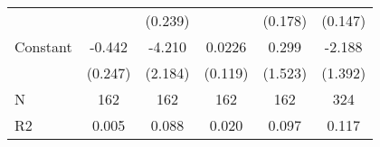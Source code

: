 {\begin{tabular}{l*{5}{c}}
                    &                     &     (0.239)         &                     &     (0.178)         &     (0.147)         \\
[1em]
Constant            &      -0.442\sym{*}  &      -4.210\sym{*}  &      0.0226         &       0.299         &      -2.188         \\
                    &     (0.247)         &     (2.184)         &     (0.119)         &     (1.523)         &     (1.392)         \\
\hline
N                   &         162         &         162         &         162         &         162         &         324         \\
R2                  &       0.005         &       0.088         &       0.020         &       0.097         &       0.117         \\
\hline\hline
\end{tabular}
}
